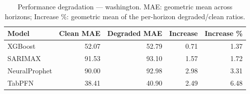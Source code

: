 \begin{table}[h]
\centering
\caption{Performance degradation — washington. MAE: geometric mean across horizons; Increase \%: geometric mean of the per-horizon degraded/clean ratios.}
\label{tab:degradation_summary_washington}
\begin{tabular}{lrrrr}
\toprule
Model & Clean MAE & Degraded MAE & Increase & Increase \% \\
\midrule
XGBoost & 52.07 & 52.79 & 0.71 & 1.37 \\
SARIMAX & 91.53 & 93.10 & 1.57 & 1.72 \\
NeuralProphet & 90.00 & 92.98 & 2.98 & 3.31 \\
TabPFN & 38.41 & 40.90 & 2.49 & 6.48 \\
\bottomrule
\end{tabular}
\end{table}
